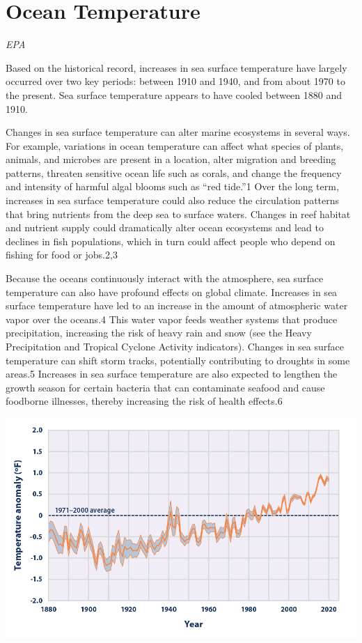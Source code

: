 \documentclass[
]{book}
\begin{document}
\hypertarget{ocean-temperature}{%
\section{Ocean Temperature}\label{ocean-temperature}}

\emph{EPA}

Based on the historical record, increases in sea surface temperature have largely occurred over two key periods: between 1910 and 1940, and from about 1970 to the present. Sea surface temperature appears to have cooled between 1880 and 1910.

Changes in sea surface temperature can alter marine ecosystems in several ways. For example, variations in ocean temperature can affect what species of plants, animals, and microbes are present in a location, alter migration and breeding patterns, threaten sensitive ocean life such as corals, and change the frequency and intensity of harmful algal blooms such as ``red tide.''1 Over the long term, increases in sea surface temperature could also reduce the circulation patterns that bring nutrients from the deep sea to surface waters. Changes in reef habitat and nutrient supply could dramatically alter ocean ecosystems and lead to declines in fish populations, which in turn could affect people who depend on fishing for food or jobs.2,3

Because the oceans continuously interact with the atmosphere, sea surface temperature can also have profound effects on global climate. Increases in sea surface temperature have led to an increase in the amount of atmospheric water vapor over the oceans.4 This water vapor feeds weather systems that produce precipitation, increasing the risk of heavy rain and snow (see the Heavy Precipitation and Tropical Cyclone Activity indicators). Changes in sea surface temperature can shift storm tracks, potentially contributing to droughts in some areas.5 Increases in sea surface temperature are also expected to lengthen the growth season for certain bacteria that can contaminate seafood and cause foodborne illnesses, thereby increasing the risk of health effects.6

\includegraphics{fig/sea_surface_tmp_2.png}
\end{document}
